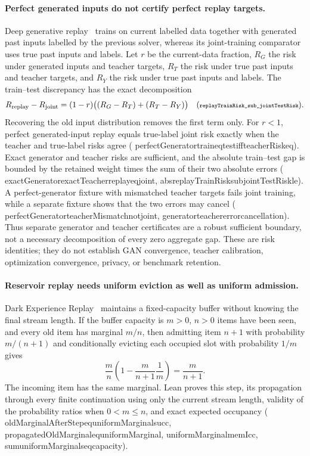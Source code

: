 \documentclass[11pt]{article}
\newcommand{\leanname}[1]{{\scriptsize\ttfamily
  \def\_{\textunderscore\allowbreak}#1}}
\begin{document}
\paragraph{Perfect generated inputs do not certify perfect replay targets.}
Deep generative replay~\cite{shin2017dgr} trains on current labelled data
together with generated past inputs labelled by the previous solver, whereas
its joint-training comparator uses true past inputs and labels.  Let $r$ be
the current-data fraction, $R_G$ the risk under generated inputs and teacher
targets, $R_T$ the risk under true past inputs and teacher targets, and $R_Y$
the risk under true past inputs and labels.  The train--test discrepancy has
the exact decomposition
\[
 R_{\rm replay}-R_{\rm joint}
  =(1-r)\bigl((R_G-R_T)+(R_T-R_Y)\bigr)
 \quad
 \text{(\leanname{replayTrainRisk\_sub\_jointTestRisk}).}
\]
Recovering the old input distribution removes the first term only.  For
$r<1$, perfect generated-input replay equals true-label joint risk exactly
when the teacher and true-label risks agree
(\leanname{perfectGenerator\_train\_eq\_test\_iff\_teacherRisk\_eq}).
Exact generator and teacher risks are sufficient, and the absolute
train--test gap is bounded by the retained weight times the sum of their two
absolute errors
(\leanname{exactGenerator\_exactTeacher\_replay\_eq\_joint},
\leanname{abs\_replayTrainRisk\_sub\_jointTestRisk\_le}).
A perfect-generator fixture with mismatched teacher targets fails joint
training, while a separate fixture shows that the two errors may cancel
(\leanname{perfectGenerator\_teacherMismatch\_not\_joint},
\leanname{generator\_teacher\_error\_cancellation}).
Thus separate generator and teacher certificates are a robust sufficient
boundary, not a necessary decomposition of every zero aggregate gap.  These
are risk identities; they do not establish GAN convergence, teacher
calibration, optimization convergence, privacy, or benchmark retention.

\paragraph{Reservoir replay needs uniform eviction as well as uniform admission.}
Dark Experience Replay~\cite{buzzega2020der} maintains a fixed-capacity buffer
without knowing the final stream length.  If the buffer capacity is
$m>0$, $n>0$ items have been seen, and every old item has marginal $m/n$,
then admitting item $n+1$ with probability $m/(n+1)$ and conditionally
evicting each occupied slot with probability $1/m$ gives
\[
 \frac{m}{n}\left(1-\frac{m}{n+1}\frac1m\right)
 =\frac{m}{n+1}.
\]
The incoming item has the same marginal.  Lean proves this step, its
propagation through every finite continuation using only the current stream
length, validity of the probability ratios when $0<m\leq n$, and exact
expected occupancy
(\leanname{oldMarginalAfterStep\_eq\_uniformMarginal\_succ},
\leanname{propagatedOldMarginal\_eq\_uniformMarginal},
\leanname{uniformMarginal\_mem\_Icc},
\leanname{sum\_uniformMarginals\_eq\_capacity}).
\end{document}
